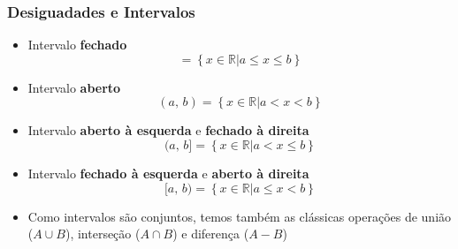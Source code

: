 \begin{frame}
  \frametitle{Desiguadades e Intervalos}
  \begin{itemize}
    \item Intervalo \textbf{fechado}
    \begin{equation*}
      [a,\,b] = \left\{x\in\mathbb{R} | a \leq x \leq b\right\}
    \end{equation*}
    \item Intervalo \textbf{aberto}
    \begin{equation*}
      (a,\,b) = \left\{x\in\mathbb{R} | a < x < b\right\}
    \end{equation*}

    \item Intervalo \textbf{aberto à esquerda} e \textbf{fechado à direita}
    \begin{equation*}
      (a,\,b] = \left\{x\in\mathbb{R} | a < x \leq b\right\}
    \end{equation*}

    \item Intervalo \textbf{fechado à esquerda} e \textbf{aberto à direita}
    \begin{equation*}
      [a,\,b) = \left\{x\in\mathbb{R} | a \leq x < b\right\}
    \end{equation*}

    \item Como intervalos são conjuntos, temos também as clássicas operações de união ($A\cup B$), interseção ($A\cap B$) e diferença ($A-B$)
  \end{itemize}
\end{frame}

